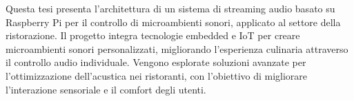 
%


Questa tesi presenta l'architettura di un sistema di streaming audio basato su Raspberry Pi per il controllo di microambienti sonori, applicato al settore della ristorazione. Il progetto integra tecnologie embedded e IoT per creare microambienti sonori personalizzati, migliorando l'esperienza culinaria attraverso il controllo audio individuale. Vengono esplorate soluzioni avanzate per l'ottimizzazione dell'acustica nei ristoranti, con l'obiettivo di migliorare l'interazione sensoriale e il comfort degli utenti.

